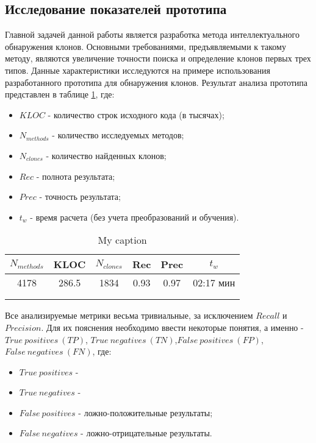 \subsection{Исследование показателей прототипа}

Главной задачей данной работы является разработка метода интеллектуального обнаружения клонов. Основными требованиями, предъявляемыми к такому методу, являются увеличение точности поиска и определение клонов первых трех типов. Данные характеристики исследуются на примере использования разработанного прототипа для обнаружения клонов. Результат анализа прототипа представлен в таблице \ref{testing}, где:

\begin{itemize}
\setlength\itemsep{0mm}
\item \(KLOC\) - количество строк исходного кода (в тысячах);
\item \(N_{methods}\) - количество исследуемых методов;
\item \(N_{clones}\) - количество найденных клонов;
\item \(Rec\) - полнота результата;
\item \(Prec\) - точность результата;
\item \(t_w\) - время расчета (без учета преобразований и обучения).
\end{itemize}

\begin{table}[H]
\centering
\captionsetup{skip=5pt}
\caption{My caption}
\label{testing}
\begin{tabular}{|c|c|c|c|c|c|}
\hline
\(N_{methods}\) & KLOC  & \(N_{clones}\) & Rec  & Prec & \(t_w\)     \\ \hline
4178     & 286.5 & 1834      & 0.93 & 0.97 & 02:17 мин \\ \hline
         &       &           &      &      &       \\ \hline
         &       &           &      &      &       \\ \hline
\end{tabular}
\end{table}

Все анализируемые метрики весьма тривиальные, за исключением \(Recall\) и \(Precision\). Для их пояснения необходимо ввести некоторые понятия, а именно - \(True\ positives\ (TP)\), \(True\ negatives\ (TN)\),\(False\ positives\ (FP)\), \(False\ negatives\ (FN)\), где:

\begin{itemize}
\setlength\itemsep{0mm}
\item \(True\ positives\) - 
\item \(True\ negatives\) - 
\item \(False\ positives\) - ложно-положительные результаты;
\item \(False\ negatives\) - ложно-отрицательные результаты.
\end{itemize}

